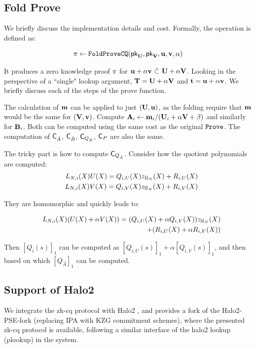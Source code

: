 \subsection{Fold Prove}
We briefly discuss the implementation details and cost.
Formally, the operation is defined as: 
\begin{small}
\[
\pi \leftarrow {\texttt{FoldProveCQ}}(\mathsf{pk}_{{{\mathbf {U}}}}, 
		\mathsf{pk}_{{{\mathbf {V}}}}, 
		{{\mathbf {u}}}, {{\mathbf {v}}}, \alpha)
\]
\end{small}

It produces
a zero knowledge proof $\pi$ for
${{\mathbf {u}}} + \alpha {{\mathbf {v}}} ~\hat{\subset}~ 
{{\mathbf {U}}} + \alpha {{\mathbf {V}}}$.
Looking in the perspective of a ``single" lookup argument,
${{\mathbf {T}}} = {{\mathbf {U}}} + \alpha {{\mathbf {V}}}$
and ${{\mathbf {t}}} = {{\mathbf {u}}} + \alpha {{\mathbf {v}}}$. 
We briefly discuss each of the steps of the prove function.

	The calculation of ${{\mathbf {m}}}$ can be applied to just 
	$({{\mathbf {U}}}, {{\mathbf {u}}})$, as the folding require that 
	${{\mathbf {m}}}$ would be the same for $({{\mathbf {V}}}, {{\mathbf {v}}})$.
	Compute
	${{\mathbf {A}}}_i \leftarrow {{\mathbf {m}}}_i/({{\mathbf {U}}}_i + \alpha{{\mathbf {V}}} + \beta)$
	and similarly for ${{\mathbf {B}}}_i$. Both can be computed
	using the same cost
	as the original $\texttt{Prove}$. The computation of
	${{\mathsf{C}}_{\hat{A}}}$, ${{\mathsf{C}}_{\hat{B}}}$, ${{\mathsf{C}}_{Q_{\hat{B}}}}$, ${{\mathsf{C}}_{P}}$ are also the same.

	The tricky part is how to compute ${\mathsf{C}}_{{Q_{\hat{A}}}}$. Consider how the
	quotient polynomials are computed:
	\begin{eqnarray*}
	& & L_{N,i}(X) U(X) = Q_{i,U}(X) z_{\mathbb{H}_{N}}(X)  + R_{i,U}(X)\\
	& & L_{N,i}(X) V(X) = Q_{i,V}(X) z_{\mathbb{H}_{N}}(X)  + R_{i,V}(X)
	\end{eqnarray*}

	They are homomorphic and quickly leads to:
	\begin{small}

	\begin{eqnarray*}
	& & L_{N,i}(X) (U(X) + \alpha V(X))= (Q_{i,U}(X) + \alpha Q_{i,V}(X)) z_{\mathbb{H}_{N}}(X)  \\
	& & ~~~	+ (R_{i,U}(X) + \alpha R_{i,V}(X))
	\end{eqnarray*}
	\end{small}

	Then $[Q_i(s)]_1$ can be computed as
	$[Q_{i,U}(s)]_1 + \alpha[Q_{i,V}(s)]_1$, and then
	based on which $[Q_{\hat{A}}]_1$ can be computed.

\subsection{Support of Halo2}
We integrate the zk-cq protocol with Halo2 \cite{Halo2}, and provides
a fork of the Halo2-PSE-fork 
(replacing IPA with KZG commitment schemes), where the presented
zk-cq protocol is available, following a similar interface of
the halo2 lookup (plookup) in the system.

